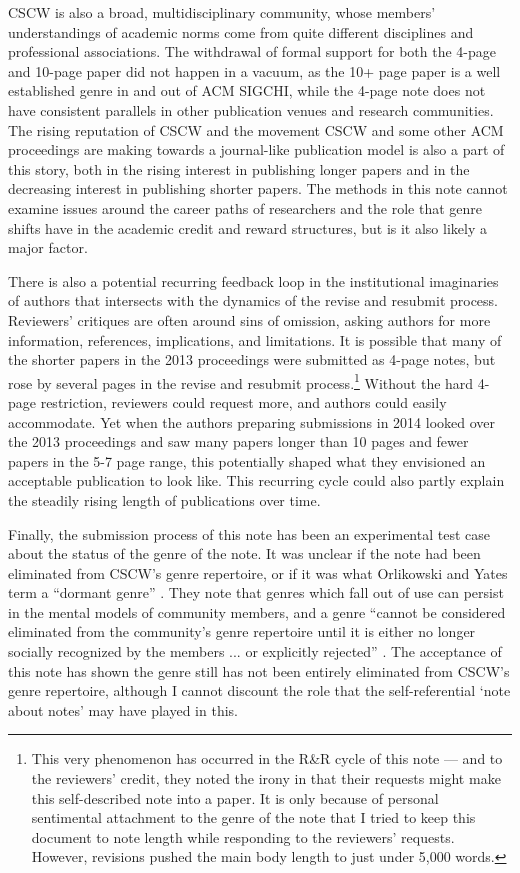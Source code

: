 \documentclass[format=acmsmall, screen=true]{acmart}
\begin{document}
CSCW is also a broad, multidisciplinary community, whose members' understandings of academic norms come from quite different disciplines and professional associations. The withdrawal of formal support for both the 4-page and 10-page paper did not happen in a vacuum, as the 10+ page paper is a well established genre in and out of ACM SIGCHI, while the 4-page note does not have consistent parallels in other publication venues and research communities. The rising reputation of CSCW and the movement CSCW and some other ACM proceedings are making towards a journal-like publication model is also a part of this story, both in the rising interest in publishing longer papers and in the decreasing interest in publishing shorter papers. The methods in this note cannot examine issues around the career paths of researchers and the role that genre shifts have in the academic credit and reward structures, but is it also likely a major factor.

There is also a potential recurring feedback loop in the institutional imaginaries of authors that intersects with the dynamics of the revise and resubmit process. Reviewers' critiques are often around sins of omission, asking authors for more information, references, implications, and limitations. It is possible that many of the shorter papers in the 2013 proceedings were submitted as 4-page notes, but rose by several pages in the revise and resubmit process.\footnote{ This very phenomenon has occurred in the R\&R cycle of this note --- and to the reviewers' credit, they noted the irony in that their requests might make this self-described note into a paper. It is only because of personal sentimental attachment to the genre of the note that I tried to keep this document to note length while responding to the reviewers' requests. However, revisions pushed the main body length to just under 5,000 words.} Without the hard 4-page restriction, reviewers could request more, and authors could easily accommodate. Yet when the authors preparing submissions in 2014 looked over the 2013 proceedings and saw many papers longer than 10 pages and fewer papers in the 5-7 page range, this potentially shaped what they envisioned an acceptable publication to look like. This recurring cycle could also partly explain the steadily rising length of publications over time.

Finally, the submission process of this note has been an experimental test case about the status of the genre of the note. It was unclear if the note had been eliminated from CSCW's genre repertoire, or if it was what Orlikowski and Yates term a ``dormant genre'' \cite{orlikowski_genre_1994}. They note that genres which fall out of use can persist in the mental models of community members, and a genre ``cannot be considered eliminated from the community's genre repertoire until it is either no longer socially recognized by the members ... or explicitly rejected'' \cite[p.549]{orlikowski_genre_1994}. The acceptance of this note has shown the genre still has not been entirely eliminated from CSCW's genre repertoire, although I cannot discount the role that the self-referential `note about notes' may have played in this. 
\end{document}
